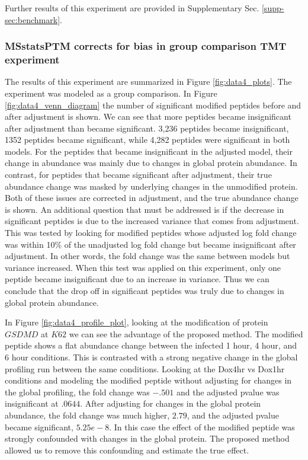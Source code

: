 \documentclass[mcp]{article}
\numberwithin{table}{section}
\begin{document}
Further results of this experiment are provided in Supplementary Sec. \ref{supp-sec:benchmark}. 

\subsubsection*{MSstatsPTM corrects for bias in group comparison TMT experiment}

The results of this experiment are summarized in Figure \ref{fig:data4_plots}. The experiment was modeled as a group comparison. In Figure \ref{fig:data4_venn_diagram} the number of significant modified peptides before and after adjustment is shown. We can see that more peptides became insignificant after adjustment than became significant. 3,236 peptides became insignificant, 1352 peptides became significant, while 4,282 peptides were significant in both models. For the peptides that became insignificant in the adjusted model, their change in abundance was mainly due to changes in global protein abundance. In contrast, for peptides that became significant after adjustment, their true abundance change was masked by underlying changes in the unmodified protein. Both of these issues are corrected in adjustment, and the true abundance change is shown. An additional question that must be addressed is if the decrease in significant peptides is due to the increased variance that comes from adjustment. This was tested by looking for modified peptides whose adjusted log fold change was within 10\% of the unadjusted log fold change but became insignificant after adjustment. In other words, the fold change was the same between models but variance increased. When this test was applied on this experiment, only one peptide became insignificant due to an increase in variance. Thus we can conclude that the drop off in significant peptides was truly due to changes in global protein abundance.

In Figure \ref{fig:data4_profile_plot}, looking at the modification of protein $GSDMD$ at $K62$ we can see the advantage of the proposed method. The modified peptide shows a flat abundance change between the infected 1 hour, 4 hour, and 6 hour conditions. This is contrasted with a strong negative change in the global profiling run between the same conditions. Looking at the Dox4hr vs Dox1hr conditions and modeling the modified peptide without adjusting for changes in the global profiling, the fold change was $-.501$ and the adjusted pvalue was insignificant at $.0644$. After adjusting for changes in the global protein abundance, the fold change was much higher, $2.79$, and the adjusted pvalue became significant, $5.25e-8$. In this case the effect of the modified peptide was strongly confounded with changes in the global protein. The proposed method allowed us to remove this confounding and estimate the true effect. 
\end{document}
